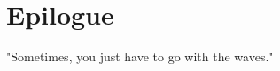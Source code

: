 \chapter*{Epilogue}
\thispagestyle{plain}


"Sometimes, you just have to go with the waves." 










